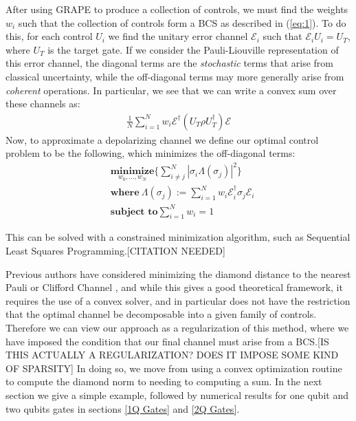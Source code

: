 \documentclass[aps,nofootinbib,pra,notitlepage,twocolumn]{revtex4-1}
\begin{document}
After using GRAPE to produce a collection of controls, we must find the weights $w_i$ such that the collection of controls form a BCS as described in (\ref{eq:1}). To do this, for each control $U_i$ we find the unitary error channel $\mathcal{E}_i$ such that $\mathcal{E}_iU_i=U_T$, where $U_T$ is the target gate. If we consider the Pauli-Liouville representation of this error channel, the diagonal terms are the \textit{stochastic} terms that arise from classical uncertainty, while the off-diagonal terms may more generally arise from \textit{coherent} operations. In particular, we see that we can write a convex sum over these channels as:
\begin{align}
 \frac{1}{N} \sum^N_{i=1} w_i \mathcal{E}^{\dagger} (U_T\rho U_T^{\dagger}) \mathcal{E}
\end{align}
Now, to approximate a depolarizing channel we define our optimal control problem to be the following, which minimizes the off-diagonal terms:
\begin{equation}\label{eq:minimization}
  \begin{split}
    &\underset{w_0, ..., w_N}{\textbf{minimize}} \{\sum_{i\neq j}^N|\sigma_i\Lambda(\sigma_j)|^2\}\\
    &\textbf{where}\ \Lambda(\sigma_j) := \sum^N_{i=1}w_i\mathcal{E}_i^{\dagger}\sigma_j\mathcal{E}_i\\
    &\textbf{subject to} \sum_{i=1}^Nw_i = 1
  \end{split}
\end{equation}

This can be solved with a constrained minimization algorithm, such as Sequential Least Squares Programming.[CITATION NEEDED]

Previous authors have considered minimizing the diamond distance to the nearest Pauli or Clifford Channel \cite{Magesan2013}, and while this gives a good theoretical framework, it requires the use of a convex solver, and in particular does not have the restriction that the optimal channel be decomposable into a given family of controls. Therefore we can view our approach as a regularization of this method, where we have imposed the condition that our final channel must arise from a BCS.[IS THIS ACTUALLY A REGULARIZATION? DOES IT IMPOSE SOME KIND OF SPARSITY] In doing so, we move from using a convex optimization routine to compute the diamond norm to needing to computing a sum. In the next section we give a simple example, followed by numerical results for one qubit and two qubits gates in sections \ref{1Q Gates} and \ref{2Q Gates}.
\end{document}
